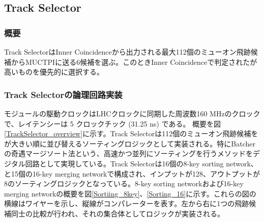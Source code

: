 \subsection{Track Selector}
\subsubsection*{概要}
Track SelectorはInner Coincidenceから出力される最大112個のミューオン飛跡候補からMUCTPIに送る6候補を選ぶ。このときInner Coincidenceで判定された\pt が高いものを優先的に選択する。

\subsubsection*{Track Selectorの論理回路実装}
モジュールの駆動クロックはLHCクロックに同期した周波数160 MHzのクロックで、レイテンシーは 5 クロックチック (31.25 ns) である。
概要を図\ref{TrackSelector_overview}に示す。Track Selectorは112個のミューオン飛跡候補を\pt が大きい順に並び替えるソーティングロジックとして実装される。特にBatcherの奇遇マージソート法\cite{Batcher}という、高速かつ並列にソーティングを行うメソッドをデジタル回路として実現している。Track Selectorは16個の8-key sorting network、と15個の16-key merging networkで構成され、インプットが128、アウトプットが8のソーティングロジックとなっている。8-key sorting networkおよび16-key merging networkの概要を図\ref{Sortiing_8key}、\ref{Sorting_16}に示す。これらの図の横線はワイヤーを示し、縦線がコンパレーターを表す。左から右に1つの飛跡候補同士の比較が行われ、それの集合体としてロジックが実装される。


